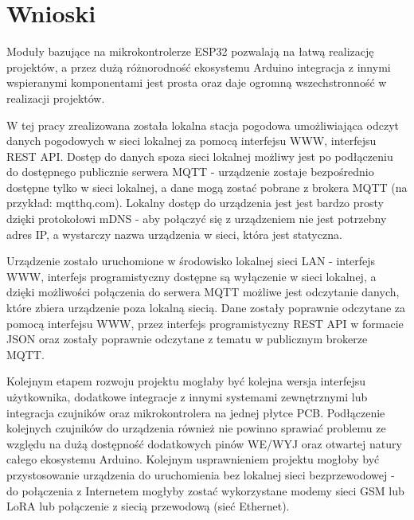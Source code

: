 \documentclass[12pt,a4paper]{article}
\begin{document}



\section{Wnioski}
Moduły bazujące na mikrokontrolerze ESP32 pozwalają na łatwą realizację projektów, a przez dużą różnorodność ekosystemu Arduino integracja z innymi wspieranymi komponentami jest prosta oraz daje ogromną wszechstronność w realizacji projektów.

W tej pracy zrealizowana została lokalna stacja pogodowa umożliwiająca odczyt danych pogodowych w sieci lokalnej za pomocą interfejsu WWW, interfejsu REST API. Dostęp do danych spoza sieci lokalnej możliwy jest po podłączeniu do dostępnego publicznie serwera MQTT - urządzenie zostaje bezpośrednio dostępne tylko w sieci lokalnej, a dane mogą zostać pobrane z brokera MQTT (na przykład: mqtthq.com). Lokalny dostęp do urządzenia jest jest bardzo prosty dzięki protokołowi mDNS - aby połączyć się z urządzeniem nie jest potrzebny adres IP, a wystarczy nazwa urządzenia w sieci, która jest statyczna.

Urządzenie zostało uruchomione w środowisko lokalnej sieci LAN - interfejs WWW, interfejs programistyczny dostępne są wyłączenie w sieci lokalnej, a 
dzięki możliwości połączenia do serwera MQTT możliwe jest odczytanie danych, które zbiera urządzenie poza lokalną siecią. Dane zostały poprawnie odczytane za pomocą interfejsu WWW, przez interfejs programistyczny REST API w formacie JSON oraz zostały poprawnie odczytane z tematu w publicznym brokerze MQTT.

Kolejnym etapem rozwoju projektu mogłaby być kolejna wersja interfejsu użytkownika, dodatkowe integracje z innymi systemami zewnętrznymi lub integracja czujników oraz mikrokontrolera na jednej płytce PCB. 
Podłączenie kolejnych czujników do urządzenia również nie powinno sprawiać problemu ze względu na dużą dostępność dodatkowych pinów WE/WYJ oraz
otwartej natury całego ekosystemu Arduino. 
Kolejnym usprawnieniem projektu mogłoby być przystosowanie urządzenia do uruchomienia bez lokalnej sieci bezprzewodowej - do połączenia z Internetem mogłyby zostać wykorzystane modemy sieci GSM lub LoRA lub połączenie z siecią przewodową (sieć Ethernet).
\end{document}
